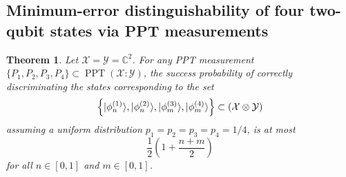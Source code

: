 \documentclass[11pt]{article}
\newtheorem{theorem}{Theorem}
\theoremstyle{definition}
\newcommand{\microspace}{\mspace{0.5mu}}
\newcommand{\PPT}{\operatorname{PPT}}
\newcommand{\ket}[1]{
  \lvert\microspace #1 \microspace \rangle}
\newcommand{\complex}{\mathbb{C}}
\newcommand{\X}{\mathcal{X}}
\newcommand{\Y}{\mathcal{Y}}
\begin{document}
\subsection{Minimum-error distinguishability of four two-qubit states via PPT measurements}

\begin{theorem}\label{thm:min_error_four_state_two_qubit_ppt}
    Let $\X = \Y = \complex^2$. For any PPT measurement $\{ P_1, P_2, P_3, P_4
    \} \subset \PPT(\X : \Y)$, the success probability of correctly
    discriminating the states corresponding to the set 
	\begin{equation}
        \left\{ 
            \ket{\phi_n^{(1)}},
            \ket{\phi_n^{(2)}},
            \ket{\phi_m^{(3)}},
            \ket{\phi_m^{(4)}} 
        \right\} \subset 
        \left(\X \otimes \Y \right)
	\end{equation}
    assuming a uniform distribution $p_1 = p_2 = p_3 = p_4 = 1/4$, is at most
    \begin{equation}
        \frac{1}{2} \left(1 + \frac{n+m}{2}\right)
    \end{equation}
    for all $n \in [0, 1]$ and $m \in [0, 1]$.
\end{theorem}
\end{document}
